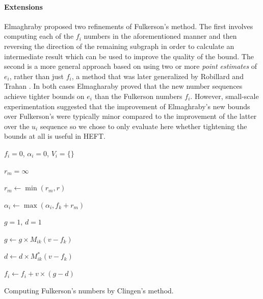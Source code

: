\documentclass[12pt]{article}
\begin{document}
 

\paragraph{Extensions}
\label{para.fulkerson_extensions}

Elmaghraby \cite{elmaghraby67} proposed two refinements of Fulkerson's method. The first involves computing each of the $f_i$ numbers in the aforementioned manner and then reversing the direction of the remaining subgraph in order to calculate an intermediate result which can be used to improve the quality of the bound. The second is a more general approach based on using two or more {\em point estimates} of $e_i$, rather than just $f_i$, a method that was later generalized by Robillard and Trahan \cite{robillard76}. In both cases Elmagharaby proved that the new number sequences achieve tighter bounds on $e_i$ than the Fulkerson numbers $f_i$. However, small-scale experimentation suggested that the improvement of Elmaghraby's new bounds over Fulkerson's were typically minor compared to the improvement of the latter over the $u_i$ sequence so we chose to only evaluate here whether tightening the bounds at all is useful in HEFT.

\begin{algorithm}	
	
	{	
		$f_i = 0$, $\alpha_i = 0$, $V_i = \{\}$
		
		{
			$r_m = \infty$
			
			{
				$r_m \leftarrow \min(r_m, r)$
				
			}
			
			$\alpha_i \leftarrow \max(\alpha_i, f_k + r_m)$
		}
		
		
		{
			{
				$g = 1$, $d = 1$
				
				{
					$g \leftarrow g \times M_{ik}(v - f_k)$
					
					$d \leftarrow d \times M_{ik}^{*}(v - f_k)$
				}
				
				$f_i \leftarrow f_i + v \times (g - d)$				
			}
		}		
	}	
	\caption{Computing Fulkerson's numbers by Clingen's method.}
	\label{alg.fulkerson}
\end{algorithm} 
\end{document}
